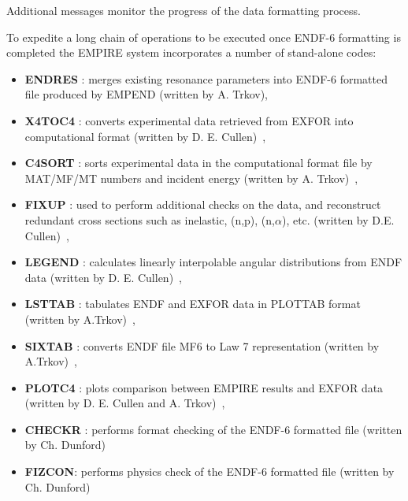 Additional messages monitor the progress of the data formatting process.

To expedite a long chain of operations to be executed once ENDF-6 formatting
is completed the EMPIRE system incorporates a number of stand-alone codes:

\begin{itemize}
\item \textbf{ENDRES%
}: merges existing resonance parameters into ENDF-6 formatted
file produced by EMPEND (written by A. Trkov),

\item \textbf{X4TOC4%
}: converts experimental data retrieved from EXFOR into
computational format (written by D. E. Cullen)~\cite{PREPRO},

\item \textbf{C4SORT%
}: sorts experimental data in the computational format file by
MAT/MF/MT numbers and incident energy (written by A. Trkov)~\cite{ENDVER},

\item \textbf{FIXUP%
}: used to perform additional checks on the data, and
reconstruct redundant cross sections such as inelastic, (n,p), (n,$\alpha$),
etc. (written by D.E. Cullen)~\cite{PREPRO},

\item \textbf{LEGEND%
}: calculates linearly interpolable angular distributions from
ENDF data (written by D. E. Cullen)~\cite{PREPRO},

\item \textbf{LSTTAB%
}: tabulates ENDF and EXFOR data in PLOTTAB format (written by
A.Trkov)~\cite{ENDVER},

\item \textbf{SIXTAB%
}: converts ENDF file MF6 to Law 7 representation (written by
A.Trkov)~\cite{ENDVER},

\item \textbf{PLOTC4%
}: plots comparison between EMPIRE results and EXFOR data
(written by D. E. Cullen and A. Trkov)~\cite{ENDVER},

\item \textbf{CHECKR%
}: performs format checking of the ENDF-6 formatted file
(written by Ch. Dunford)

\item \textbf{FIZCON}: performs physics check of the ENDF-6 formatted file
(written by Ch. Dunford)


\end{itemize}
